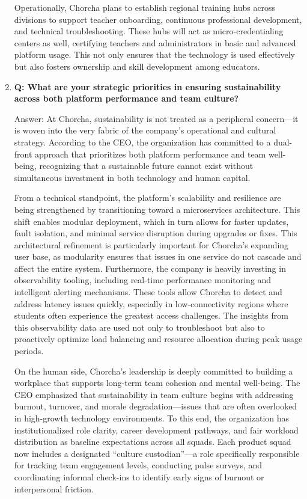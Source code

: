 \documentclass[12pt,a4paper,oneside]{book}
\begin{document}
\begin{enumerate}
Operationally, Chorcha plans to establish regional training hubs across divisions to support teacher onboarding, continuous professional development, and technical troubleshooting. These hubs will act as micro-credentialing centers as well, certifying teachers and administrators in basic and advanced platform usage. This not only ensures that the technology is used effectively but also fosters ownership and skill development among educators.

\item \textbf{Q: What are your strategic priorities in ensuring sustainability across both platform performance and team culture?}

Answer: At Chorcha, sustainability is not treated as a peripheral concern—it is woven into the very fabric of the company’s operational and cultural strategy. According to the CEO, the organization has committed to a dual-front approach that prioritizes both platform performance and team well-being, recognizing that a sustainable future cannot exist without simultaneous investment in both technology and human capital.

From a technical standpoint, the platform’s scalability and resilience are being strengthened by transitioning toward a microservices architecture. This shift enables modular deployment, which in turn allows for faster updates, fault isolation, and minimal service disruption during upgrades or fixes. This architectural refinement is particularly important for Chorcha’s expanding user base, as modularity ensures that issues in one service do not cascade and affect the entire system. Furthermore, the company is heavily investing in observability tooling, including real-time performance monitoring and intelligent alerting mechanisms. These tools allow Chorcha to detect and address latency issues quickly, especially in low-connectivity regions where students often experience the greatest access challenges. The insights from this observability data are used not only to troubleshoot but also to proactively optimize load balancing and resource allocation during peak usage periods.

On the human side, Chorcha’s leadership is deeply committed to building a workplace that supports long-term team cohesion and mental well-being. The CEO emphasized that sustainability in team culture begins with addressing burnout, turnover, and morale degradation—issues that are often overlooked in high-growth technology environments. To this end, the organization has institutionalized role clarity, career development pathways, and fair workload distribution as baseline expectations across all squads. Each product squad now includes a designated “culture custodian”—a role specifically responsible for tracking team engagement levels, conducting pulse surveys, and coordinating informal check-ins to identify early signs of burnout or interpersonal friction.


\end{enumerate}
\end{document}
